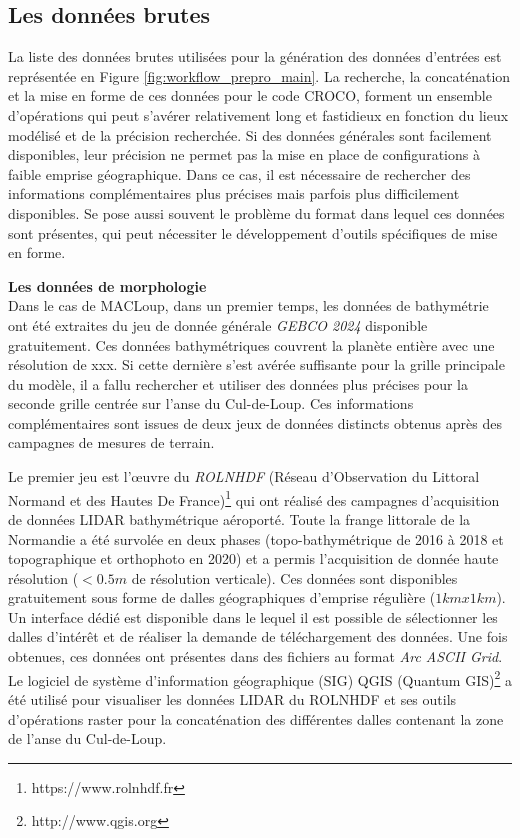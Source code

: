 \documentclass[10pt,a4paper,titlepage]{article}
\begin{document}
\subsection{Les données brutes}

La liste des données brutes utilisées pour la génération des données d'entrées est représentée en Figure \ref{fig:workflow_prepro_main}. La recherche, la concaténation et la mise en forme de ces données pour le code CROCO, forment un ensemble d'opérations qui peut s'avérer relativement long et fastidieux en fonction du lieux modélisé et de la précision recherchée. Si des données générales sont facilement disponibles, leur précision ne permet pas la mise en place de configurations à faible emprise géographique. Dans ce cas, il est nécessaire de rechercher des informations complémentaires plus précises mais parfois plus difficilement disponibles. Se pose aussi souvent le problème du format dans lequel ces données sont présentes, qui peut nécessiter le développement d'outils spécifiques de mise en forme.

\textbf{Les données de morphologie}\\
Dans le cas de MACLoup, dans un premier temps, les données de bathymétrie ont été extraites du jeu de donnée générale \textit{GEBCO 2024} disponible gratuitement. Ces données bathymétriques couvrent la planète entière avec une résolution de \alert{xxx}. Si cette dernière s'est avérée suffisante pour la grille principale du modèle, il a fallu rechercher et utiliser des données plus précises pour la seconde grille centrée sur l'anse du Cul-de-Loup. Ces informations complémentaires sont issues de deux jeux de données distincts obtenus après des campagnes de mesures de terrain.

Le premier jeu est l'\oe{}uvre du \textit{ROLNHDF} (Réseau d'Observation du Littoral Normand et des Hautes De France)\footnote{https://www.rolnhdf.fr} qui ont réalisé des campagnes d'acquisition de données LIDAR bathymétrique aéroporté. Toute la frange littorale de la Normandie a été survolée en deux phases (topo-bathymétrique de 2016 à 2018 et topographique et orthophoto en 2020) et a permis l'acquisition de donnée haute résolution ($<0.5 m$ de résolution verticale). Ces données sont disponibles gratuitement sous forme de dalles géographiques d'emprise régulière ($1 km x 1 km$). Un interface dédié est disponible dans le lequel il est possible de sélectionner les dalles d'intérêt et de réaliser la demande de téléchargement des données. Une fois obtenues, ces données ont présentes dans des fichiers au format \textit{Arc ASCII Grid}. Le logiciel de système d'information géographique (SIG) QGIS (Quantum GIS)\footnote{http://www.qgis.org} a été utilisé pour visualiser les données LIDAR du ROLNHDF et ses outils d'opérations raster pour la concaténation des différentes dalles contenant la zone de l'anse du Cul-de-Loup.
\end{document}

